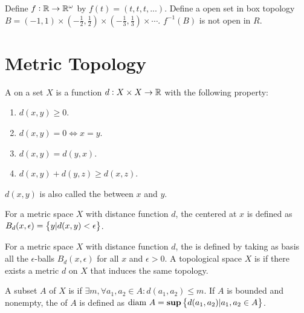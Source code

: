 \begin{example}
    Define $f: \mathbb{R} \rightarrow \mathbb{R}^{\omega}$ by $f(t) = (t,t,t, ...)$. Define a open set in box topology $B = (-1, 1) \times (- \frac{1}{2}, \frac{1}{2}) \times  (- \frac{1}{3}, \frac{1}{3}) \times \cdots$. $f^{-1}(B)$ is not open in $R$.
\end{example}

\section{Metric Topology}

\begin{definition}
    A  on a set $X$ is a function $d: X \times X \rightarrow \mathbb{R}$ with the following property:
    \begin{enumerate}
        \item $d(x,y) \geq 0$.
        \item $d(x,y) = 0 \Leftrightarrow x = y$.
        \item $d(x,y) = d(y,x)$.
        \item $d(x,y) + d(y,z) \geq d(x,z)$.
    \end{enumerate}
    $d(x,y)$ is also called the  between $x$ and $y$.
\end{definition}

\begin{definition}
    For a metric space $X$ with distance function $d$, the  centered at $x$ is defined as $B_d(x, \epsilon) = \set{y | d(x,y) < \epsilon}$.
\end{definition}

\begin{definition}
    For a metric space $X$ with distance function $d$, the  is defined by taking as basis all the $\epsilon$-balls $B_d(x,\epsilon)$ for all $x$ and $\epsilon > 0$. A topological space $X$ is  if there exists a metric $d$ on $X$ that induces the same topology.
\end{definition}

\begin{definition}
    A subset $A$ of $X$ is  if $\exists m, \forall a_1, a_2 \in A: d(a_1, a_2) \leq m$. If $A$ is bounded and nonempty, the  of $A$ is defined as $\text{diam } A = \mathbf{sup} \set{d(a_1, a_2)| a_1, a_2 \in A} $.
\end{definition}

